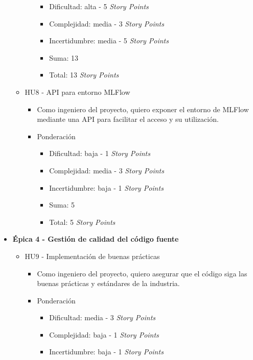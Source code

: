 \documentclass[
11pt, %
]{charter}
\begin{document}
\begin{itemize}
\begin{itemize}
\begin{itemize}
\begin{itemize}
                \item Dificultad: alta - 5 \textit{Story Points}
                \item Complejidad: media - 3 \textit{Story Points}
                \item Incertidumbre: media - 5 \textit{Story Points}
                \item Suma: 13
                \item Total: 13 \textit{Story Points}
            \end{itemize}
        \end{itemize}
      \item HU8 - API para entorno MLFlow
        \begin{itemize}
            \item Como ingeniero del proyecto, quiero exponer el entorno de MLFlow mediante una API para facilitar el acceso y su utilización.
            \item Ponderación
            \begin{itemize}
                \item Dificultad: baja - 1 \textit{Story Points}
                \item Complejidad: media - 3 \textit{Story Points}
                \item Incertidumbre: baja - 1 \textit{Story Points}
                \item Suma: 5
                \item Total: 5 \textit{Story Points}
            \end{itemize}
        \end{itemize}
    \end{itemize}
  \item \textbf{\'{E}pica 4 - Gestión de calidad del código fuente}
    \begin{itemize}
      \item HU9 - Implementación de buenas prácticas
        \begin{itemize}
            \item Como ingeniero del proyecto, quiero asegurar que el código siga las buenas prácticas y estándares de la industria.
            \item Ponderación
            \begin{itemize}
                \item Dificultad: media - 3 \textit{Story Points}
                \item Complejidad: baja - 1 \textit{Story Points}
                \item Incertidumbre: baja - 1 \textit{Story Points}

\end{itemize}
\end{itemize}
\end{itemize}
\end{itemize}
\end{document}

